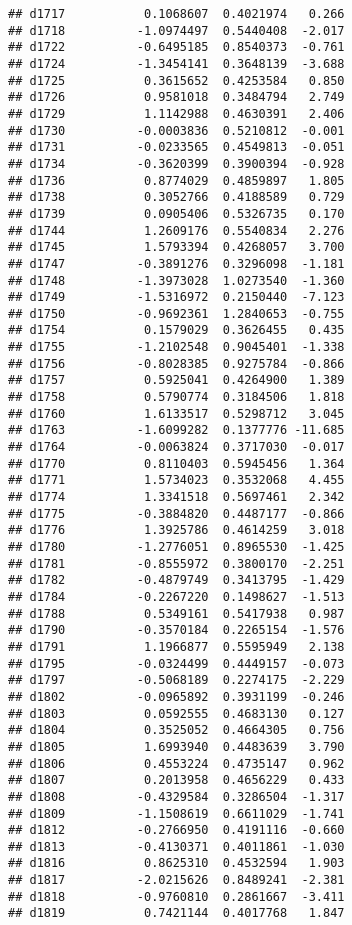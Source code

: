 \documentclass[
]{article}
\begin{document}
\begin{verbatim}
## d1717           0.1068607  0.4021974   0.266
## d1718          -1.0974497  0.5440408  -2.017
## d1722          -0.6495185  0.8540373  -0.761
## d1724          -1.3454141  0.3648139  -3.688
## d1725           0.3615652  0.4253584   0.850
## d1726           0.9581018  0.3484794   2.749
## d1729           1.1142988  0.4630391   2.406
## d1730          -0.0003836  0.5210812  -0.001
## d1731          -0.0233565  0.4549813  -0.051
## d1734          -0.3620399  0.3900394  -0.928
## d1736           0.8774029  0.4859897   1.805
## d1738           0.3052766  0.4188589   0.729
## d1739           0.0905406  0.5326735   0.170
## d1744           1.2609176  0.5540834   2.276
## d1745           1.5793394  0.4268057   3.700
## d1747          -0.3891276  0.3296098  -1.181
## d1748          -1.3973028  1.0273540  -1.360
## d1749          -1.5316972  0.2150440  -7.123
## d1750          -0.9692361  1.2840653  -0.755
## d1754           0.1579029  0.3626455   0.435
## d1755          -1.2102548  0.9045401  -1.338
## d1756          -0.8028385  0.9275784  -0.866
## d1757           0.5925041  0.4264900   1.389
## d1758           0.5790774  0.3184506   1.818
## d1760           1.6133517  0.5298712   3.045
## d1763          -1.6099282  0.1377776 -11.685
## d1764          -0.0063824  0.3717030  -0.017
## d1770           0.8110403  0.5945456   1.364
## d1771           1.5734023  0.3532068   4.455
## d1774           1.3341518  0.5697461   2.342
## d1775          -0.3884820  0.4487177  -0.866
## d1776           1.3925786  0.4614259   3.018
## d1780          -1.2776051  0.8965530  -1.425
## d1781          -0.8555972  0.3800170  -2.251
## d1782          -0.4879749  0.3413795  -1.429
## d1784          -0.2267220  0.1498627  -1.513
## d1788           0.5349161  0.5417938   0.987
## d1790          -0.3570184  0.2265154  -1.576
## d1791           1.1966877  0.5595949   2.138
## d1795          -0.0324499  0.4449157  -0.073
## d1797          -0.5068189  0.2274175  -2.229
## d1802          -0.0965892  0.3931199  -0.246
## d1803           0.0592555  0.4683130   0.127
## d1804           0.3525052  0.4664305   0.756
## d1805           1.6993940  0.4483639   3.790
## d1806           0.4553224  0.4735147   0.962
## d1807           0.2013958  0.4656229   0.433
## d1808          -0.4329584  0.3286504  -1.317
## d1809          -1.1508619  0.6611029  -1.741
## d1812          -0.2766950  0.4191116  -0.660
## d1813          -0.4130371  0.4011861  -1.030
## d1816           0.8625310  0.4532594   1.903
## d1817          -2.0215626  0.8489241  -2.381
## d1818          -0.9760810  0.2861667  -3.411
## d1819           0.7421144  0.4017768   1.847

\end{verbatim}
\end{document}
